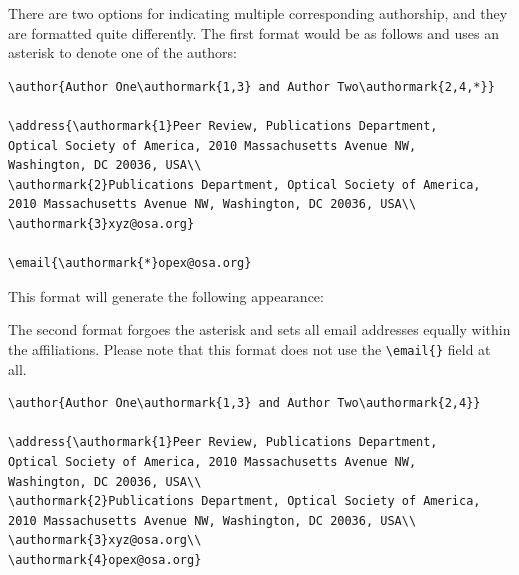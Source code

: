 \documentclass{osa-article}
\begin{document}
There are two options for indicating multiple corresponding authorship, and they are formatted quite differently. The first format would be as follows and uses an asterisk to denote one of the authors:

\begin{verbatim}
\author{Author One\authormark{1,3} and Author Two\authormark{2,4,*}}

\address{\authormark{1}Peer Review, Publications Department,
Optical Society of America, 2010 Massachusetts Avenue NW,
Washington, DC 20036, USA\\
\authormark{2}Publications Department, Optical Society of America,
2010 Massachusetts Avenue NW, Washington, DC 20036, USA\\
\authormark{3}xyz@osa.org}

\email{\authormark{*}opex@osa.org}
\end{verbatim}

This format will generate the following appearance:

\medskip

\author{Author One and Author Two}

\address{Peer Review, Publications Department,
Optical Society of America, 2010 Massachusetts Avenue NW,
Washington, DC 20036, USA\\
Publications Department, Optical Society of America,
2010 Massachusetts Avenue NW, Washington, DC 20036, USA\\
xyz@osa.org}


\medskip

The second format forgoes the asterisk and sets all email addresses equally within the affiliations. Please note that this format does not use the \verb+\email{}+ field at all.
\begin{verbatim}
\author{Author One\authormark{1,3} and Author Two\authormark{2,4}}

\address{\authormark{1}Peer Review, Publications Department,
Optical Society of America, 2010 Massachusetts Avenue NW,
Washington, DC 20036, USA\\
\authormark{2}Publications Department, Optical Society of America,
2010 Massachusetts Avenue NW, Washington, DC 20036, USA\\
\authormark{3}xyz@osa.org\\
\authormark{4}opex@osa.org}
\end{verbatim}
\end{document}
